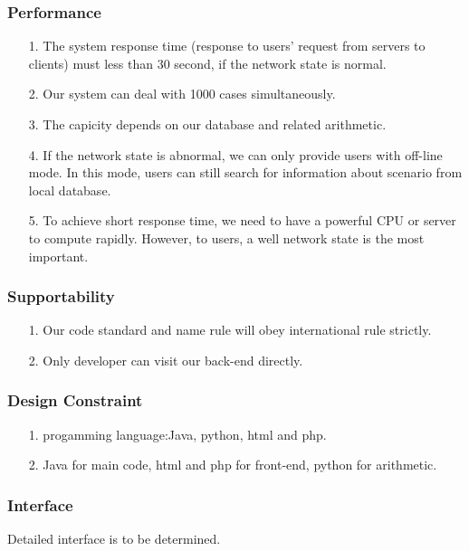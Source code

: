 \documentclass[10pt]{article}
\begin{document}
\subsubsection{Performance}
\begin{itemize}
	\item[1.] The system response time (response to users’ request from servers to clients) must less than 30 second, if the network state is normal.
	\item[2.] Our system can deal with 1000 cases simultaneously.
	\item[3.]  The capicity depends on our database and related arithmetic.
	\item[4.] If the network state is abnormal, we can only provide users with off-line mode. In this mode, users can still search for information about scenario from local database.
	\item[5.]To achieve short response time, we need to have a powerful CPU or server to compute rapidly. However, to users, a well network state is the most important.  
\end{itemize}

\subsubsection{Supportability}
\begin{itemize}
	\item[1.] Our code standard and name rule will obey international rule strictly.
	\item[2.]Only developer can visit our back-end directly. 
\end{itemize}

\subsubsection{Design Constraint}
\begin{itemize}
	\item[1.] progamming language:Java, python, html and php.
	\item[2.] Java for main code, html and php for front-end, python for arithmetic.

\end{itemize}

\subsubsection{Interface}
Detailed interface is to be determined.
\end{document}
